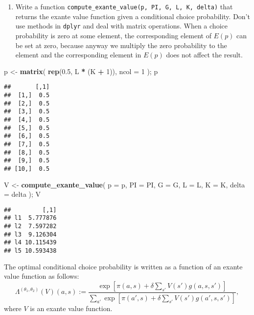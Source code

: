 \documentclass[
]{book}
\newenvironment{Shaded}{\begin{snugshade}}{\end{snugshade}}
\newcommand{\AttributeTok}[1]{\textcolor[rgb]{0.13,0.29,0.53}{#1}}
\newcommand{\DecValTok}[1]{\textcolor[rgb]{0.00,0.00,0.81}{#1}}
\newcommand{\FloatTok}[1]{\textcolor[rgb]{0.00,0.00,0.81}{#1}}
\newcommand{\FunctionTok}[1]{\textcolor[rgb]{0.13,0.29,0.53}{\textbf{#1}}}
\newcommand{\NormalTok}[1]{#1}
\newcommand{\OtherTok}[1]{\textcolor[rgb]{0.56,0.35,0.01}{#1}}
\newcommand{\SpecialCharTok}[1]{\textcolor[rgb]{0.81,0.36,0.00}{\textbf{#1}}}
\providecommand{\tightlist}{%
  \setlength{\itemsep}{0pt}\setlength{\parskip}{0pt}}
\begin{document}
\begin{enumerate}
\def\labelenumi{\arabic{enumi}.}
\setcounter{enumi}{3}
\tightlist
\item
  Write a function \texttt{compute\_exante\_value(p,\ PI,\ G,\ L,\ K,\ delta)} that returns the exante value function given a conditional choice probability. Don't use methods in \texttt{dplyr} and deal with matrix operations. When a choice probability is zero at some element, the corresponding element of \(E(p)\) can be set at zero, because anyway we multiply the zero probability to the element and the corresponding element in \(E(p)\) does not affect the result.
\end{enumerate}

\begin{Shaded}
\begin{Highlighting}[]
\NormalTok{p }\OtherTok{\textless{}{-}} 
  \FunctionTok{matrix}\NormalTok{(}
    \FunctionTok{rep}\NormalTok{(}\FloatTok{0.5}\NormalTok{, L }\SpecialCharTok{*}\NormalTok{ (K }\SpecialCharTok{+} \DecValTok{1}\NormalTok{)), }
    \AttributeTok{ncol =} \DecValTok{1}
\NormalTok{    ); }
\NormalTok{p}
\end{Highlighting}
\end{Shaded}

\begin{verbatim}
##       [,1]
##  [1,]  0.5
##  [2,]  0.5
##  [3,]  0.5
##  [4,]  0.5
##  [5,]  0.5
##  [6,]  0.5
##  [7,]  0.5
##  [8,]  0.5
##  [9,]  0.5
## [10,]  0.5
\end{verbatim}

\begin{Shaded}
\begin{Highlighting}[]
\NormalTok{V }\OtherTok{\textless{}{-}} 
  \FunctionTok{compute\_exante\_value}\NormalTok{(}
    \AttributeTok{p =}\NormalTok{ p, }
    \AttributeTok{PI =}\NormalTok{ PI, }
    \AttributeTok{G =}\NormalTok{ G, }
    \AttributeTok{L =}\NormalTok{ L, }
    \AttributeTok{K =}\NormalTok{ K, }
    \AttributeTok{delta =}\NormalTok{ delta}
\NormalTok{    ); }
\NormalTok{V}
\end{Highlighting}
\end{Shaded}

\begin{verbatim}
##         [,1]
## l1  5.777876
## l2  7.597282
## l3  9.126304
## l4 10.115439
## l5 10.593438
\end{verbatim}

The optimal conditional choice probability is written as a function of an exante value function as follows:
\[
\Lambda^{(\theta_1, \theta_2)}(V)(a, s) := \frac{\exp[\pi(a, s) + \delta \sum_{s'}V(s')g(a, s, s')]}{\sum_{a'}\exp[\pi(a', s) + \delta \sum_{s'}V(s')g(a', s, s')]},
\]
where \(V\) is an exante value function.
\end{document}
